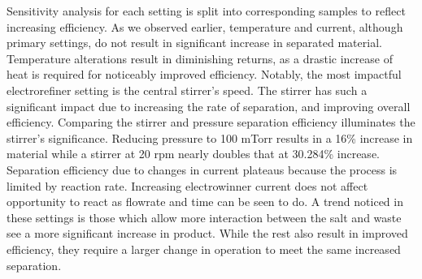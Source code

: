 Sensitivity analysis for each setting is split into corresponding samples to reflect increasing efficiency. As we observed earlier, temperature and current, although primary settings, 
do not result in significant increase in separated material. Temperature alterations result in diminishing returns, as a drastic increase of heat is required for noticeably improved efficiency. Notably,
the most impactful electrorefiner setting is the central stirrer's speed. The stirrer  
has such a significant impact due to increasing the rate of separation, and improving overall
efficiency. Comparing the stirrer and pressure separation efficiency illuminates the stirrer's significance. Reducing pressure to 100 mTorr results in a 16\% increase in material while a stirrer at 20 rpm nearly doubles that at 30.284\% increase.
Separation efficiency due to changes in current plateaus because the process is limited by reaction rate. Increasing electrowinner current does not affect opportunity to react as flowrate and time can be seen to do. 
A trend noticed in these settings is those which allow more interaction between the salt and waste see a more significant increase in product. 
While the rest also result in
improved efficiency, they require a larger change in operation to meet the same increased separation.